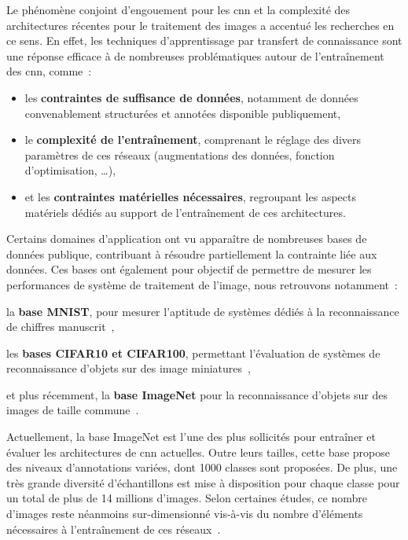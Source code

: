 Le phénomène conjoint d'engouement pour les \gls{cnn} et la complexité des architectures récentes pour le traitement des images a accentué les recherches en ce sens. En effet, les techniques d'apprentissage par transfert de connaissance sont une réponse efficace à de nombreuses problématiques autour de l'entraînement des \gls{cnn}, comme~: 
\begin{itemize}
    \item les \textbf{contraintes de suffisance de données}, notamment de données convenablement structurées et annotées disponible publiquement,
    \item le \textbf{complexité de l'entraînement}, comprenant le réglage des divers paramètres de ces réseaux (augmentations des données, fonction d'optimisation, \ldots),
    \item et les \textbf{contraintes matérielles nécessaires}, regroupant les aspects matériels dédiés au support de l'entraînement de ces architectures.
\end{itemize}\par

Certains domaines d'application ont vu apparaître de nombreuses bases de données publique, contribuant à résoudre partiellement la contrainte liée aux données. Ces bases ont également pour objectif de permettre de mesurer les performances de système de traitement de l'image, nous retrouvons notamment~: 
\begin{inlinerate}
    \item la \textbf{base MNIST}, pour mesurer l'aptitude de systèmes dédiés à la reconnaissance de chiffres manuscrit~\cite{lecun2010},
    \item les \textbf{bases CIFAR10 et CIFAR100}, permettant l'évaluation de systèmes de reconnaissance d'objets sur des image miniatures~\cite{Krizhevsky}, 
    \item et plus récemment, la \textbf{base ImageNet} pour la reconnaissance d'objets sur des images de taille commune~\cite{Deng2008}. 
\end{inlinerate}\par

Actuellement, la base ImageNet est l'une des plus sollicités pour entraîner et évaluer les architectures de \gls{cnn} actuelles. Outre leurs tailles, cette base propose des niveaux d'annotations variées, dont 1000 classes sont proposées. De plus, une très grande diversité d'échantillons est mise à disposition pour chaque classe pour un total de plus de 14 millions d'images. Selon certaines études, ce nombre d'images reste néanmoins sur-dimensionné vis-à-vis du nombre d'éléments nécessaires à l'entraînement de ces réseaux~\cite{Huh2016}.\par

